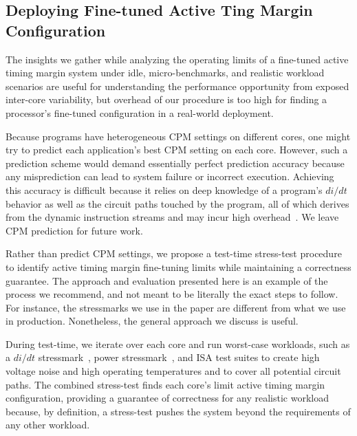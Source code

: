 \subsection{Deploying Fine-tuned Active Ting Margin Configuration}

The insights we gather while analyzing the operating limits of a fine-tuned active timing margin system under idle, micro-benchmarks, and realistic workload scenarios are useful for understanding the performance opportunity from exposed inter-core variability, but overhead of our procedure is too high for finding a processor's fine-tuned configuration in a real-world deployment.

Because programs have heterogeneous CPM settings on different cores, one might try to predict each application's best CPM setting on each core. However, such a prediction scheme would demand essentially perfect prediction accuracy because any misprediction can lead to system failure or incorrect execution. Achieving this accuracy is difficult because it relies on deep knowledge of a program's $di/dt$ behavior as well as the circuit paths touched by the program, all of which derives from the dynamic instruction streams and may incur high overhead~\cite{reddi2009voltage}. We leave CPM prediction for future work.

Rather than predict CPM settings, we propose a test-time stress-test procedure to identify active timing margin fine-tuning limits while maintaining a correctness guarantee. The approach and evaluation presented here is an example of the process we recommend, and not meant to be literally the exact steps to follow. For instance, the stressmarks we use in the paper are different from what we use in production. Nonetheless, the general approach we discuss is useful.

During test-time, we iterate over each core and run worst-case workloads, such as a $di/dt$ stressmark~\cite{kim2012audit,bertran2014voltage}, power stressmark~\cite{bertran2012systematic}, and ISA test suites to create high voltage noise and high operating temperatures and to cover all potential circuit paths. The combined stress-test finds each core's limit active timing margin configuration, providing a guarantee of correctness for any realistic workload because, by definition, a stress-test pushes the system beyond the requirements of any other workload.

